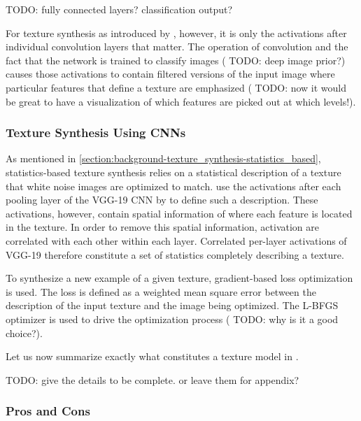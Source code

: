 {\color{red} TODO: fully connected layers? classification output?}

For texture synthesis as introduced by \citet{Gatys2015}, however, it is only the activations after individual convolution layers that matter. The operation of convolution and the fact that the network is trained to classify images ({\color{red} TODO: deep image prior?}) causes those activations to contain filtered versions of the input image where particular features that define a texture are emphasized ({\color{red} TODO: now it would be great to have a visualization of which features are picked out at which levels!}).

\subsubsection{Texture Synthesis Using CNNs}
\label{section:background-texture_synthesis-statistics_based-synthesis_using_cnns}

As mentioned in \ref{section:background-texture_synthesis-statistics_based}, statistics-based texture synthesis relies on a statistical description of a texture that white noise images are optimized to match. \citet{Gatys2015} use the activations after each pooling layer of the VGG-19 CNN by \citet{Simonyan2014} to define such a description. These activations, however, contain spatial information of where each feature is located in the texture. In order to remove this spatial information, activation are correlated with each other within each layer. Correlated per-layer activations of VGG-19 therefore constitute a set of statistics completely describing a texture.

To synthesize a new example of a given texture, gradient-based loss optimization is used. The loss is defined as a weighted mean square error between the description of the input texture and the image being optimized. The L-BFGS optimizer is used to drive the optimization process ({\color{red} TODO: why is it a good choice?}).

Let us now summarize exactly what constitutes a texture model in \citet{Gatys2015}.

{\color{red} TODO: give the details to be complete. or leave them for appendix?}

\subsubsection{Pros and Cons}
\label{section:background-texture_synthesis-statistics_based-pros_and_cons}

